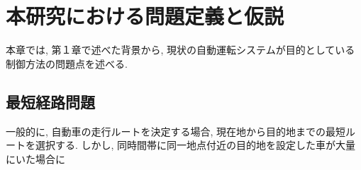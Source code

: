 \chapter{本研究における問題定義と仮説}
\label{issue}

本章では, 第１章で述べた背景から, 現状の自動運転システムが目的としている制御方法の問題点を述べる.

\section{最短経路問題}

一般的に, 自動車の走行ルートを決定する場合, 現在地から目的地までの最短ルートを選択する.
しかし, 同時間帯に同一地点付近の目的地を設定した車が大量にいた場合に

